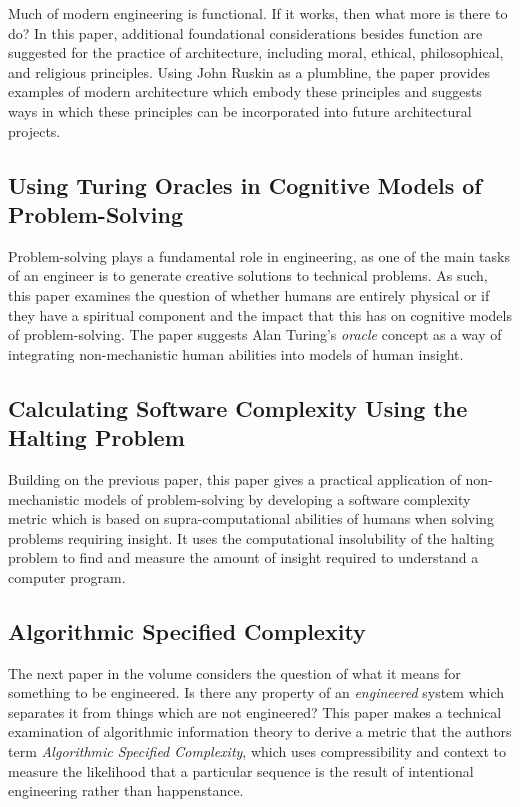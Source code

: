 Much of modern engineering is functional.  If it works, then what more is there to do?  
In this paper, additional foundational considerations besides function are suggested
for the practice of architecture, including moral, ethical, philosophical, and religious
principles.  Using John Ruskin as a plumbline, the paper provides examples of modern 
architecture which embody these principles and suggests ways in which these principles
can be incorporated into future architectural projects.

\subsection*{Using Turing Oracles in Cognitive Models of Problem-Solving}

Problem-solving plays a fundamental role in engineering, as one of the main tasks of an engineer
is to generate creative solutions to technical problems.  As such, this paper examines 
the question of whether humans are entirely physical or if they have
a spiritual component and the impact that this has on cognitive models of problem-solving.  The
paper suggests Alan Turing's \emph{oracle} concept as a way of integrating non-mechanistic human
abilities into models of human insight.

\subsection*{Calculating Software Complexity Using the Halting Problem}

Building on the previous paper, this paper gives a practical application of non-mechanistic
models of problem-solving by developing a software complexity metric which is based on 
supra-computational abilities of humans when solving problems requiring insight.  It uses
the computational insolubility of the halting problem to find and measure the amount of 
insight required to understand a computer program.

\subsection*{Algorithmic Specified Complexity}

The next paper in the volume considers the question of 
what it means for something to be engineered.
Is there any property of an \emph{engineered} system which separates
it from things which are not engineered?  This paper makes a technical examination of 
algorithmic information theory to derive a metric that the authors term
\emph{Algorithmic Specified Complexity}, which uses compressibility and context to 
measure the likelihood that a particular sequence is the result of intentional engineering rather
than happenstance.

